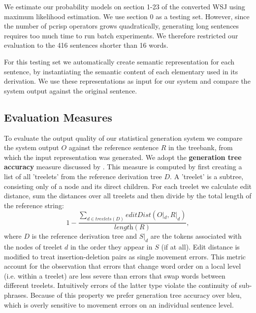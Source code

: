 We estimate our probability models on section 1-23 of the converted WSJ using maximum likelihood estimation. We use section 0 as a testing set. However, since the number of {\sc pcrisp} operators grows quadratically, generating long sentences requires too much time to run batch experiments.
We therefore restricted our evaluation to the 416 sentences shorter than 16 words.  

For this testing set we automatically create semantic representation for each sentence, by instantiating the semantic content of each elementary used in its derivation. We use these representations as input for our system and compare the system output against the original sentence.

\subsection{Evaluation Measures}
\label{ssec:eval-measures}
To evaluate the output quality of our statistical generation system we compare the system output $O$ against the reference sentence $R$ in the treebank, from which the input representation was generated. We adopt the {\bf generation tree accuracy} measure discussed by \cite{bangalorerambowwhittaker2001}.
This measure is computed by first creating a list of all 'treelets' from the reference derivation tree $D$. A 'treelet' is a subtree, consisting only of a node and its direct children. For each treelet we calculate edit distance, sum the distances over all treelets and then divide by the total length of the reference string:
$$1 - \frac{\sum\limits_{d \in treelets(D)} editDist(O|_d, R|_d)}{\textit{length}(R)},$$
where $D$ is the reference derivation tree and $S|_d$ are the tokens associated with the nodes of treelet $d$ in the order they appear in $S$ (if at all). 
Edit distance is modified to treat insertion-deletion pairs as single movement errors. 
This metric account for the observation that errors that change word order on a local level (i.e. within a treelet) are less severe than errors that swap words between different treelets. Intuitively errors of the latter type violate the continuity of sub-phrases. Because of this property we prefer generation tree accuracy over {\sc bleu}, which is overly sensitive to movement errors on an individual sentence level.


